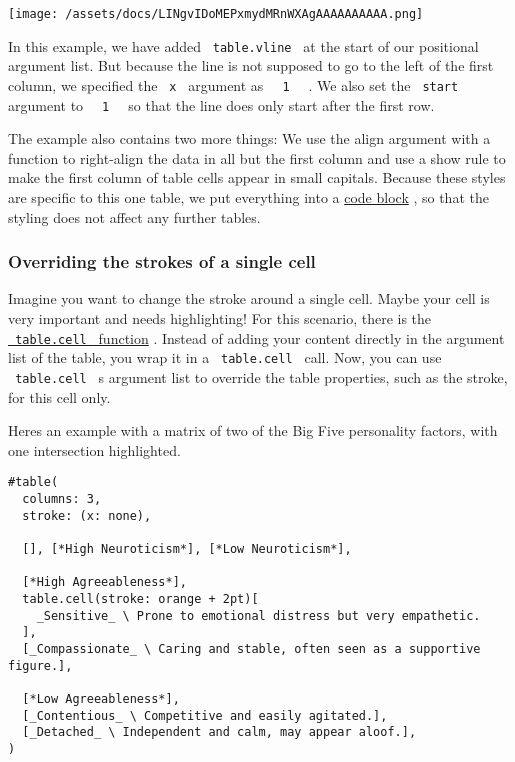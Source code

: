 \texttt{[image: /assets/docs/LINgvIDoMEPxmydMRnWXAgAAAAAAAAAA.png]}

In this example, we have added \texttt{\ table.vline\ } at the start of
our positional argument list. But because the line is not supposed to go
to the left of the first column, we specified the \texttt{\ x\ }
argument as \texttt{\ }{\texttt{\ 1\ }}\texttt{\ } . We also set the
\texttt{\ start\ } argument to \texttt{\ }{\texttt{\ 1\ }}\texttt{\ } so
that the line does only start after the first row.

The example also contains two more things: We use the align argument
with a function to right-align the data in all but the first column and
use a show rule to make the first column of table cells appear in small
capitals. Because these styles are specific to this one table, we put
everything into a \href{/docs/reference/scripting/\#blocks}{code block}
, so that the styling does not affect any further tables.

\subsubsection{Overriding the strokes of a single
cell}\label{stroke-override}

Imagine you want to change the stroke around a single cell. Maybe your
cell is very important and needs highlighting! For this scenario, there
is the
\href{/docs/reference/model/table/\#definitions-cell}{\texttt{\ table.cell\ }
function} . Instead of adding your content directly in the argument list
of the table, you wrap it in a \texttt{\ table.cell\ } call. Now, you
can use \texttt{\ table.cell\ } \textquotesingle s argument list to
override the table properties, such as the stroke, for this cell only.

Here\textquotesingle s an example with a matrix of two of the Big Five
personality factors, with one intersection highlighted.

\begin{verbatim}
#table(
  columns: 3,
  stroke: (x: none),

  [], [*High Neuroticism*], [*Low Neuroticism*],

  [*High Agreeableness*],
  table.cell(stroke: orange + 2pt)[
    _Sensitive_ \ Prone to emotional distress but very empathetic.
  ],
  [_Compassionate_ \ Caring and stable, often seen as a supportive figure.],

  [*Low Agreeableness*],
  [_Contentious_ \ Competitive and easily agitated.],
  [_Detached_ \ Independent and calm, may appear aloof.],
)
\end{verbatim}

